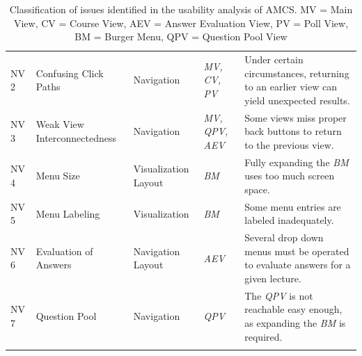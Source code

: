 \begin{small}
\begin{longtable}{  p{0.8cm}  p{3cm}  p{2cm}  p{1.6cm}  p{5.8cm} }
		NV 2 & Confusing Click Paths & Navigation & \emph{MV,  CV,  PV} & Under certain circumstances, returning to an earlier view can yield unexpected results. \\ 
		NV 3 & Weak View Interconnectedness & Navigation & \emph{MV,  QPV,  AEV} & Some views miss proper back buttons to return to the previous view. \\ 
		NV 4 & Menu Size & Visualization  Layout & \emph{BM} & Fully expanding the \emph{BM} uses too much screen space. \\ 
		NV 5 & Menu Labeling & Visualization & \emph{BM} & Some menu entries are labeled inadequately. \\             
		NV 6 & Evaluation of Answers & Navigation  Layout & \emph{AEV} & Several drop down menus must be operated to evaluate answers for a given lecture. \\     
		NV 7 & Question Pool & Navigation & \emph{QPV} & The \emph{QPV} is not reachable easy enough, as expanding the \emph{BM} is required. \\ \hline                                    
		
		\caption{Classification of issues identified in the usability analysis of AMCS. MV = Main View, CV = Course View, AEV = Answer Evaluation View, PV = Poll View, BM = Burger Menu, QPV = Question Pool View }
		\label{tab:problems2}
	\end{longtable}
\end{small}
